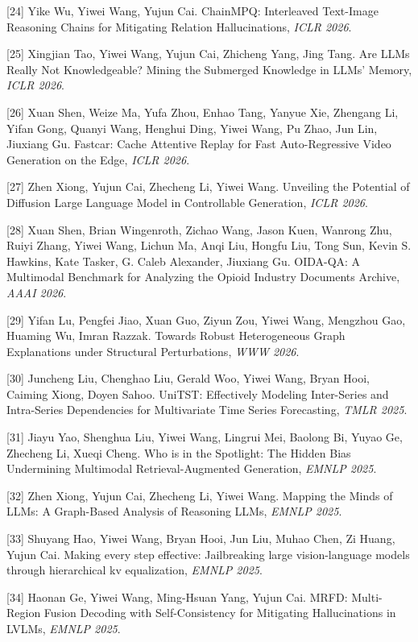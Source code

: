 [24] Yike Wu, Yiwei Wang, Yujun Cai. ChainMPQ: Interleaved Text-Image Reasoning Chains for Mitigating Relation Hallucinations, \textit{ICLR 2026}.

[25] Xingjian Tao, Yiwei Wang, Yujun Cai, Zhicheng Yang, Jing Tang. Are LLMs Really Not Knowledgeable? Mining the Submerged Knowledge in LLMs' Memory, \textit{ICLR 2026}.

[26] Xuan Shen, Weize Ma, Yufa Zhou, Enhao Tang, Yanyue Xie, Zhengang Li, Yifan Gong, Quanyi Wang, Henghui Ding, Yiwei Wang, Pu Zhao, Jun Lin, Jiuxiang Gu. Fastcar: Cache Attentive Replay for Fast Auto-Regressive Video Generation on the Edge, \textit{ICLR 2026}.

[27] Zhen Xiong, Yujun Cai, Zhecheng Li, Yiwei Wang. Unveiling the Potential of Diffusion Large Language Model in Controllable Generation, \textit{ICLR 2026}.

[28] Xuan Shen, Brian Wingenroth, Zichao Wang, Jason Kuen, Wanrong Zhu, Ruiyi Zhang, Yiwei Wang, Lichun Ma, Anqi Liu, Hongfu Liu, Tong Sun, Kevin S. Hawkins, Kate Tasker, G. Caleb Alexander, Jiuxiang Gu. OIDA-QA: A Multimodal Benchmark for Analyzing the Opioid Industry Documents Archive, \textit{AAAI 2026}.

[29] Yifan Lu, Pengfei Jiao, Xuan Guo, Ziyun Zou, Yiwei Wang, Mengzhou Gao, Huaming Wu, Imran Razzak. Towards Robust Heterogeneous Graph Explanations under Structural Perturbations, \textit{WWW 2026}.

[30] Juncheng Liu, Chenghao Liu, Gerald Woo, Yiwei Wang, Bryan Hooi, Caiming Xiong, Doyen Sahoo. UniTST: Effectively Modeling Inter-Series and Intra-Series Dependencies for Multivariate Time Series Forecasting, \textit{TMLR 2025}.

[31] Jiayu Yao, Shenghua Liu, Yiwei Wang, Lingrui Mei, Baolong Bi, Yuyao Ge, Zhecheng Li, Xueqi Cheng. Who is in the Spotlight: The Hidden Bias Undermining Multimodal Retrieval-Augmented Generation, \textit{EMNLP 2025}.

[32] Zhen Xiong, Yujun Cai, Zhecheng Li, Yiwei Wang. Mapping the Minds of LLMs: A Graph-Based Analysis of Reasoning LLMs, \textit{EMNLP 2025}.

[33] Shuyang Hao, Yiwei Wang, Bryan Hooi, Jun Liu, Muhao Chen, Zi Huang, Yujun Cai. Making every step effective: Jailbreaking large vision-language models through hierarchical kv equalization, \textit{EMNLP 2025}.

[34] Haonan Ge, Yiwei Wang, Ming-Hsuan Yang, Yujun Cai. MRFD: Multi-Region Fusion Decoding with Self-Consistency for Mitigating Hallucinations in LVLMs, \textit{EMNLP 2025}.

